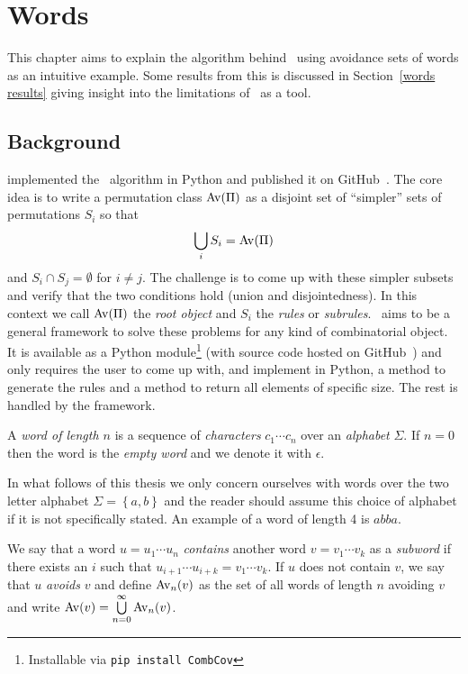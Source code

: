 \chapter{Words\label{words chapter}}

This chapter aims to explain the algorithm behind \CombCov\ using avoidance sets
of words as an intuitive example. Some results from this is discussed in 
Section~\ref{words results} giving insight into the limitations of \CombCov\ as 
a tool.

\section{Background\label{words background}}

\textcite{bean_automatic_2019} implemented the \Struct\ algorithm in Python and 
published it on GitHub~\cite{bean_permstruct_2017}. The core idea is to write a 
permutation class ${\mathrm{Av}\!\left(\Pi\right)}$ as a disjoint set of ``simpler'' sets of 
permutations $S_i$ so that \[\bigcup_i S_i = {\mathrm{Av}\!\left(\Pi\right)}\] and $S_i \cap S_j = 
\emptyset$ for $i \neq j$. The challenge is to come up with these simpler 
subsets and verify that the two conditions hold (union and disjointedness). In 
this context we call ${\mathrm{Av}\!\left(\Pi\right)}$ the \emph{root object} and $S_i$ the 
\emph{rules} or \emph{subrules}. \CombCov\ aims to be a general framework to 
solve these problems for any kind of combinatorial object. It is available as a 
Python module\footnote{Installable via \texttt{pip install CombCov}} (with 
source code hosted on GitHub~\cite{kristinsson_combcov:_2019}) and only requires 
the user to come up with, and implement in Python, a method to generate the rules 
and a method to return all elements of specific size. 
The rest is handled by the framework.

\begin{definition}
  A \emph{word of length $n$} is a sequence of \emph{characters} $c_1 \cdots 
  c_n$ over an \emph{alphabet} $\Sigma$. If $n = 0$ then the word is the 
  \emph{empty word} and we denote it with $\epsilon$.
\end{definition}

In what follows of this thesis we only concern ourselves with words over the two 
letter alphabet $\Sigma = \left\{ a,b \right\}$ and the reader should assume 
this choice of alphabet if it is not specifically stated. An example of a word of 
length 4 is $abba$.

\begin{definition}
  We say that a word $u = u_1 \cdots u_n$ \emph{contains} another word $v = v_1 
  \cdots v_k$ as a \emph{subword} if there exists an $i$ such that $u_{i+1} 
  \cdots u_{i+k} = v_1 \cdots v_k$. If $u$ does not contain $v$, we say that $u$ 
  \emph{avoids} $v$ and define ${\mathrm{Av}_n\!\left(v\right)}$ as the set of all words of length $n$ 
  avoiding $v$ and write ${\mathrm{Av}\!\left(v\right)} = \bigcup\limits_{n=0}^{\infty}{\mathrm{Av}_n\!\left(v\right)}$.
\end{definition}


